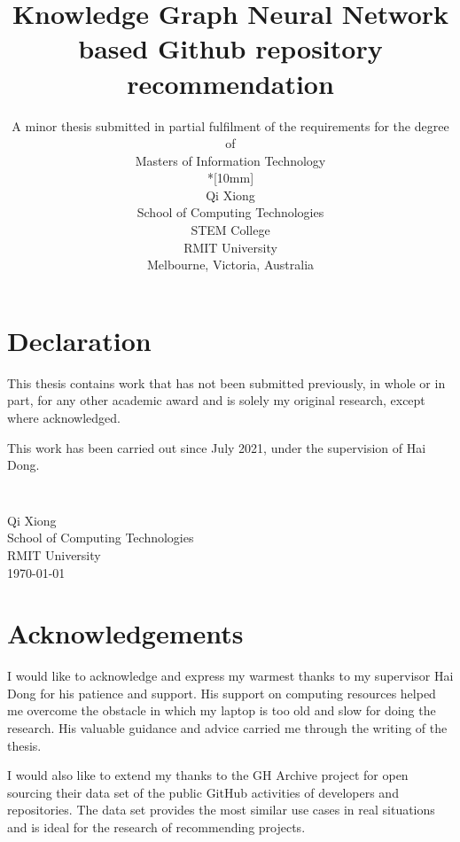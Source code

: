 \documentclass[11pt,twoside]{report}
\newcommand{\SubmissionDate}{\today}
\newcommand{\student}{Qi Xiong}
\newcommand{\supervisor}{Hai Dong}
\newcommand{\topic}{Knowledge Graph Neural Network based Github repository recommendation}
\newcommand{\school}{School of Computing Technologies}
\newcommand{\program}{Masters of Information Technology}
\newcommand{\institution}{RMIT University}
\begin{document}
\title{{\Large\bf \topic}}
\author{
A minor thesis submitted in partial fulfilment of the requirements for the degree of
\\\program\\*[10mm]
\\\student
\\\school
\\STEM College
\\\institution
\\Melbourne, Victoria, Australia
}
\maketitle
\thispagestyle{empty}

\chapter*{Declaration}

This thesis contains work that has not been submitted previously, in
whole or in part, for any other academic award and is solely my
original research, except where acknowledged.

This work has been carried out since July 2021, under the
supervision of {\supervisor}.

\paragraph{}
\vspace{5cm}\noindent \\\student \\
\school\\
\institution\\
\SubmissionDate


\chapter*{Acknowledgements}

I would like to acknowledge and express my warmest thanks to my supervisor Hai Dong for his patience and support. His support on computing resources helped me overcome the obstacle in which my laptop is too old and slow for doing the research. His valuable guidance and advice carried me through the writing of the thesis.

I would also like to extend my thanks to the GH Archive project for open sourcing their data set of the public GitHub activities of developers and repositories. The data set provides the most similar use cases in real situations and is ideal for the research of recommending projects.
\end{document}
